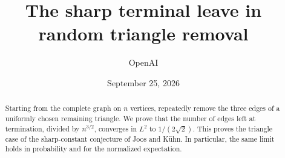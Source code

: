 \documentclass[11pt]{article}
\title{The sharp terminal leave in random triangle removal}
\author{OpenAI}
\date{September 25, 2026}
\begin{document}
\maketitle
\begin{abstract}
Starting from the complete graph on $n$ vertices, repeatedly remove the three
edges of a uniformly chosen remaining triangle. We prove that the number of
edges left at termination, divided by $n^{3/2}$, converges in $L^2$ to
$1/(2\sqrt2)$. This proves the triangle case of the sharp-constant conjecture
of Joos and K\"uhn. In particular, the same limit holds in probability and
for the normalized expectation.
\end{abstract}
\tableofcontents
\clearpage









\end{document}
